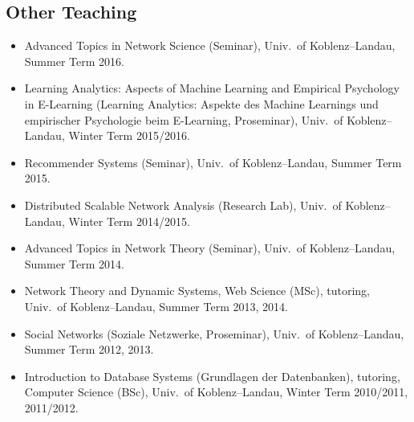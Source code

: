 \documentclass[line,mm]{res}
\newcounter{y}
\newcounter{z}
\begin{document}
\begin{resume}
\section{Other Teaching}
\begin{itemize}
\item Advanced Topics in Network Science (Seminar), Univ.\ of
  Koblenz--Landau, Summer Term 2016. 
\item Learning Analytics: Aspects of Machine Learning and Empirical Psychology in E-Learning (Learning
    Analytics: Aspekte des Machine Learnings und empirischer Psychologie
    beim E-Learning, Proseminar), Univ.\ of Koblenz--Landau, Winter Term 2015/2016.
\item Recommender Systems (Seminar), Univ.\ of Koblenz--Landau, Summer Term 2015.
\item Distributed Scalable Network Analysis (Research Lab), Univ.\ of
  Koblenz--Landau, Winter Term 2014/2015. 
\item Advanced Topics in Network Theory (Seminar), Univ.\ of
  Koblenz--Landau, Summer Term 2014. 
\item Network Theory and Dynamic Systems, Web Science (MSc), tutoring, Univ.\ of
  Koblenz--Landau, Summer Term 2013, 2014.
\item Social Networks (Soziale Netzwerke, Proseminar), Univ.\ of
  Koblenz--Landau, Summer Term 2012, 2013.
\item
  Introduction to Database Systems (Grundlagen der Datenbanken), tutoring,
  Computer Science (BSc), Univ.\ of
  Koblenz--Landau, Winter Term 2010/2011, 2011/2012. 
\end{itemize}


\end{resume}
\end{document}
